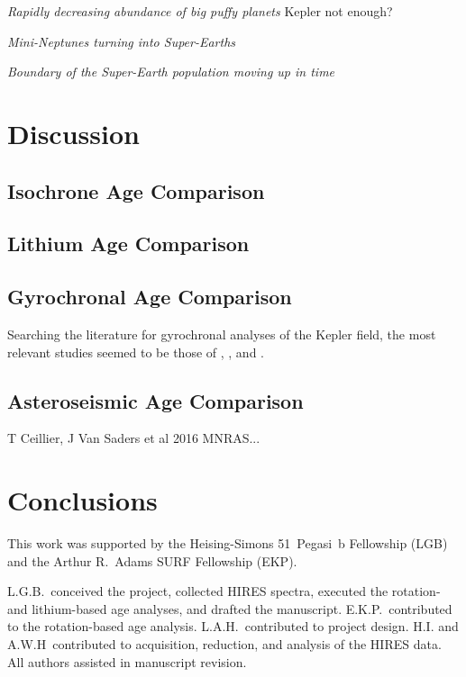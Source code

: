 \documentclass[11pt,twocolumn,tighten]{aastex63}
\begin{document}
{\it Rapidly decreasing abundance of big puffy planets}
Kepler not enough?

{\it Mini-Neptunes turning into Super-Earths}
\citep[e.g.][]{Rogers_2021}

{\it Boundary of the Super-Earth population moving up in time}
\citep{David_2021}


\section{Discussion}
\label{sec:disc}

\subsection{Isochrone Age Comparison}

\subsection{Lithium Age Comparison}

\subsection{Gyrochronal Age Comparison}
Searching the literature for gyrochronal analyses of the Kepler field,
the most relevant studies seemed to be those of
\citet{Walkowicz_2013}, \citet{Reinhold_2015}, and 
\citet{David_2021}.

\subsection{Asteroseismic Age Comparison}
T Ceillier, J Van Saders et al 2016 MNRAS...


\section{Conclusions}
\label{sec:conclusions}

\acknowledgements
This work was supported by the 
Heising-Simons 51~Pegasi~b Fellowship (LGB)
and the Arthur R.~Adams SURF Fellowship (EKP).

L.G.B.~conceived the project, collected HIRES spectra, executed the
rotation- and lithium-based age analyses, and drafted the manuscript.
E.K.P.~contributed to the rotation-based age analysis.
L.A.H.~contributed to project design.
H.I. and A.W.H~contributed to acquisition, reduction, and analysis of
the HIRES data.
All authors assisted in manuscript revision.
\end{document}
